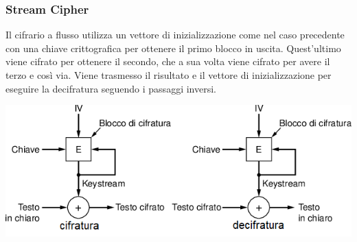 \documentclass[10pt,a4paper,twoside]{article}
\begin{document}
\subsubsection{Stream Cipher}
\begin{minipage}{0.4\textwidth}
Il cifrario a flusso utilizza un vettore di inizializzazione come nel caso precedente con una chiave crittografica per ottenere il primo blocco in uscita. Quest'ultimo viene cifrato per ottenere il secondo, che a sua volta viene cifrato per avere il terzo e così via. Viene trasmesso il risultato e il vettore di inizializzazione per eseguire la decifratura seguendo i passaggi inversi.
\end{minipage}
\begin{minipage}{0.5\textwidth}
\begin{flushright}
\includegraphics[width=\textwidth]{images/stream_cipher.png}
\end{flushright}
\end{minipage}
\end{document}
